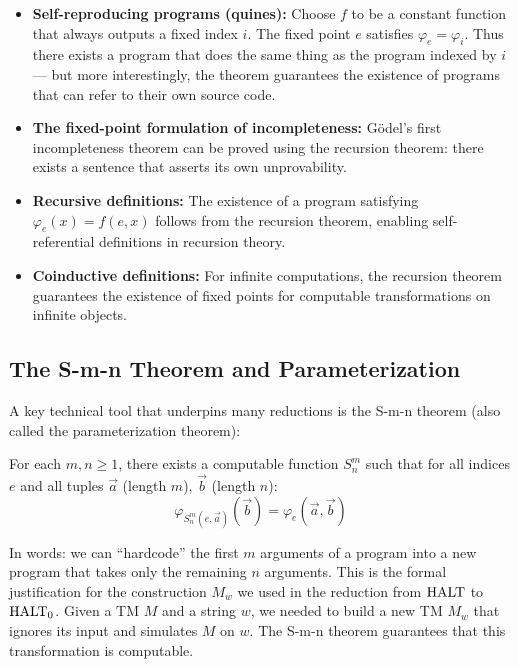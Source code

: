 \begin{itemize}
\item \textbf{Self-reproducing programs (quines):} Choose $f$ to be a constant function that always outputs a fixed index $i$. The fixed point $e$ satisfies $\varphi_e = \varphi_i$. Thus there exists a program that does the same thing as the program indexed by $i$ — but more interestingly, the theorem guarantees the existence of programs that can refer to their own source code.

\item \textbf{The fixed-point formulation of incompleteness:} G\"odel's first incompleteness theorem can be proved using the recursion theorem: there exists a sentence that asserts its own unprovability.

\item \textbf{Recursive definitions:} The existence of a program satisfying $\varphi_e(x) = f(e, x)$ follows from the recursion theorem, enabling self-referential definitions in recursion theory.

\item \textbf{Coinductive definitions:} For infinite computations, the recursion theorem guarantees the existence of fixed points for computable transformations on infinite objects.
\end{itemize}

\subsection*{The S-m-n Theorem and Parameterization}

A key technical tool that underpins many reductions is the S-m-n theorem (also called the parameterization theorem):

\begin{theorem}
For each $m, n \ge 1$, there exists a computable function $S^m_n$ such that for all indices $e$ and all tuples $\vec{a}$ (length $m$), $\vec{b}$ (length $n$):
\[
\varphi_{S^m_n(e, \vec{a})}(\vec{b}) = \varphi_e(\vec{a}, \vec{b})
\]
\end{theorem}

In words: we can ``hardcode'' the first $m$ arguments of a program into a new program that takes only the remaining $n$ arguments. This is the formal justification for the construction $M_w$ we used in the reduction from $\text{HALT}$ to $\text{HALT}_0$. Given a TM $M$ and a string $w$, we needed to build a new TM $M_w$ that ignores its input and simulates $M$ on $w$. The S-m-n theorem guarantees that this transformation is computable.

